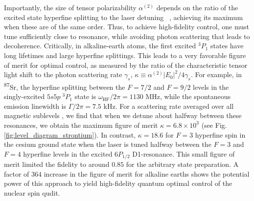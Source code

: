 \documentclass[aps,prl,twocolumn,reprint,superscriptaddress,footinbib]{revtex4-2}
\begin{document}
Importantly, the size of tensor polarizability $\alpha^{(2)}$ depends on the ratio of the excited state hyperfine splitting to the laser detuning~\cite{deutsch2010quantum} , achieving its maximum when these are of the same order.  Thus, to achieve high-fidelity control, one must tune sufficiently close to resonance, while avoiding photon scattering that leads to decoherence. Critically, in alkaline-earth atoms, the first excited $^3P_1$ states have long lifetimes and large hyperfine splittings. This leads to a very favorable figure of merit for optimal control, as measured by the ratio of the characteristic tensor light shift to the photon scattering rate  $\gamma_s$,  $\kappa \equiv \alpha^{(2)} \left| E_0 \right|^2 /4 \gamma_s$.  For example, in \textsuperscript{87}Sr, the hyperfine splitting between the $F=7/2$ and  $F=9/2$ levels in the singly-excited $5s5p \; ^3P_1$ state is $\omega_{\mathrm{HF}}/2\pi=1130$ MHz, while the spontaneous emission linewidth is $\Gamma/2\pi = 7.5$ kHz.   For a scattering rate averaged over all magnetic sublevels \cite{deutsch2010quantum}, we find that when we detune  about halfway between these resonances, we obtain the maximum figure of merit $\kappa =6.8 \times 10^3$ (see Fig. \ref{fig:level_diagram_strontium}).  In contrast, $\kappa =18.6$ for $F=3$ hyperfine spin in the cesium ground state when the laser is tuned halfway between the $F=3$ and $F=4$ hyperfine levels in the excited $6P_{1/2}$ D1-resonance.  This small figure of merit limited the fidelity to around $0.85$ for the arbitrary state preparation.  A factor of $364$ increase in the figure of merit for alkaline earths shows the potential power of this approach to yield high-fidelity quantum optimal control of the nuclear spin qudit.
\end{document}
